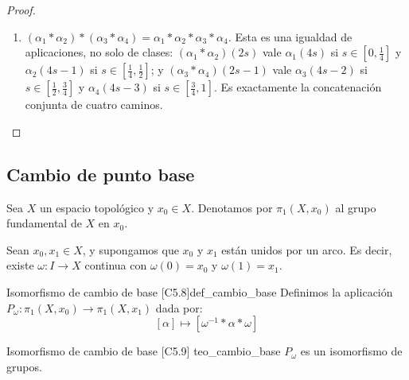 \begin{proof}
\begin{enumerate}
    \emph{Alternativa con la reparametrización:} $\alpha * \beta * \gamma = (\alpha * (\beta * \gamma)) \circ h$ con $h(s) = \frac{3s}{2}$ si $s \in [0,\frac13]$ y $h(s) = \frac{3s+1}{4}$ si $s \in [\frac13,1]$.
    \item \emph{$(\alpha_1 * \alpha_2) * (\alpha_3 * \alpha_4) = \alpha_1 * \alpha_2 * \alpha_3 * \alpha_4$.} Esta es una igualdad de aplicaciones, no solo de clases: $(\alpha_1 * \alpha_2)(2s)$ vale $\alpha_1(4s)$ si $s \in [0,\frac14]$ y $\alpha_2(4s-1)$ si $s \in [\frac14,\frac12]$; y $(\alpha_3 * \alpha_4)(2s-1)$ vale $\alpha_3(4s-2)$ si $s \in [\frac12,\frac34]$ y $\alpha_4(4s-3)$ si $s \in [\frac34,1]$. Es exactamente la concatenación conjunta de cuatro caminos.
\end{enumerate}
\end{proof}

\subsection{Cambio de punto base}

Sea $X$ un espacio topológico y $x_0 \in X$. Denotamos por $\pi_1(X, x_0)$ al grupo fundamental de $X$ en $x_0$.

Sean $x_0, x_1 \in X$, y supongamos que $x_0$ y $x_1$ están unidos por un arco. Es decir, existe $\omega : I \to X$ continua con $\omega(0) = x_0$ y $\omega(1) = x_1$.

\begin{definicion}{Isomorfismo de cambio de base [C5.8]}{def_cambio_base}
Definimos la aplicación $P_\omega : \pi_1(X, x_0) \to \pi_1(X, x_1)$ dada por:
\[
[\alpha] \mapsto [\omega^{-1} * \alpha * \omega]
\]
\end{definicion}

\begin{teorema}{Isomorfismo de cambio de base [C5.9] \marcaT}{teo_cambio_base}
$P_\omega$ es un isomorfismo de grupos.
\end{teorema}


